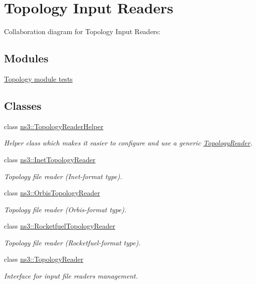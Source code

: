 \hypertarget{group__topology}{}\section{Topology Input Readers}
\label{group__topology}
Collaboration diagram for Topology Input Readers\+:
\subsection*{Modules}
\begin{DoxyCompactItemize}
\item 
\hyperlink{group__topology-test}{Topology module tests}
\end{DoxyCompactItemize}
\subsection*{Classes}
\begin{DoxyCompactItemize}
\item 
class \hyperlink{classns3_1_1TopologyReaderHelper}{ns3\+::\+Topology\+Reader\+Helper}
\begin{DoxyCompactList}\small\item\em Helper class which makes it easier to configure and use a generic \hyperlink{classns3_1_1TopologyReader}{Topology\+Reader}. \end{DoxyCompactList}\item 
class \hyperlink{classns3_1_1InetTopologyReader}{ns3\+::\+Inet\+Topology\+Reader}
\begin{DoxyCompactList}\small\item\em Topology file reader (Inet-\/format type). \end{DoxyCompactList}\item 
class \hyperlink{classns3_1_1OrbisTopologyReader}{ns3\+::\+Orbis\+Topology\+Reader}
\begin{DoxyCompactList}\small\item\em Topology file reader (Orbis-\/format type). \end{DoxyCompactList}\item 
class \hyperlink{classns3_1_1RocketfuelTopologyReader}{ns3\+::\+Rocketfuel\+Topology\+Reader}
\begin{DoxyCompactList}\small\item\em Topology file reader (Rocketfuel-\/format type). \end{DoxyCompactList}\item 
class \hyperlink{classns3_1_1TopologyReader}{ns3\+::\+Topology\+Reader}
\begin{DoxyCompactList}\small\item\em Interface for input file readers management. \end{DoxyCompactList}\end{DoxyCompactItemize}



